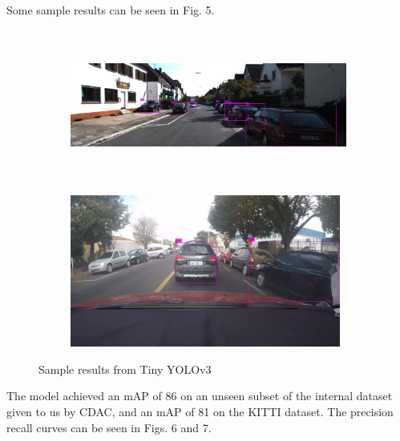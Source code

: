 \documentclass[12pt,letterpaper]{article}
\begin{document}
Some sample results can be seen in Fig. 5.

\begin{figure}[H]
    \centering
    \begin{subfigure}{0.45\textwidth}
        \includegraphics[width = 0.9\linewidth,height=5cm]{assets/yolo_fig1.jpg}
        \caption{}
    \end{subfigure}
    \begin{subfigure}{0.45\textwidth}
        \includegraphics[width=0.9\linewidth,height=5cm]{assets/yolo_fig2.jpg}
        \caption{}
    \end{subfigure}
    \caption{Sample results from Tiny YOLOv3}
\end{figure}

The model achieved an mAP of 86 on an unseen subset of the internal dataset given to us by CDAC, and an mAP of 81 on the KITTI dataset. The precision recall curves can be seen in Figs. 6 and 7.
\end{document}
